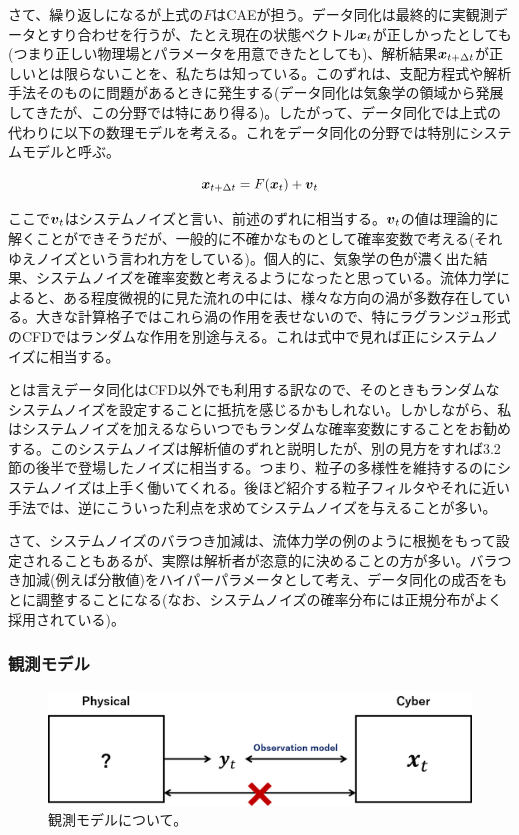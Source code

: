 \documentclass[dvipdfmx, 9pt, a4paper]{jsarticle}
\newcommand{\bm}[1]{{\mbox{\boldmath $#1$}}}
\begin{document}
さて、繰り返しになるが上式の$F$はCAEが担う。データ同化は最終的に実観測データとすり合わせを行うが、たとえ現在の状態ベクトル$\bm x_t$が正しかったとしても(つまり正しい物理場とパラメータを用意できたとしても)、解析結果$\bm x_{t+\Delta t}$が正しいとは限らないことを、私たちは知っている。このずれは、支配方程式や解析手法そのものに問題があるときに発生する(データ同化は気象学の領域から発展してきたが、この分野では特にあり得る)。したがって、データ同化では上式の代わりに以下の数理モデルを考える。これをデータ同化の分野では特別にシステムモデルと呼ぶ。
\begin{tcolorbox}[title=データ同化のシステムモデル]
\begin{equation}
\bm x_{t+\Delta t}=F(\bm x_t)+\bm v_t
\end{equation}
\end{tcolorbox}
ここで$\bm v_t$はシステムノイズと言い、前述のずれに相当する。$\bm v_t$の値は理論的に解くことができそうだが、一般的に不確かなものとして確率変数で考える(それゆえノイズという言われ方をしている)。個人的に、気象学の色が濃く出た結果、システムノイズを確率変数と考えるようになったと思っている。流体力学によると、ある程度微視的に見た流れの中には、様々な方向の渦が多数存在している。大きな計算格子ではこれら渦の作用を表せないので、特にラグランジュ形式のCFDではランダムな作用を別途与える。これは式中で見れば正にシステムノイズに相当する。\par
とは言えデータ同化はCFD以外でも利用する訳なので、そのときもランダムなシステムノイズを設定することに抵抗を感じるかもしれない。しかしながら、私はシステムノイズを加えるならいつでもランダムな確率変数にすることをお勧めする。このシステムノイズは解析値のずれと説明したが、別の見方をすれば3.2節の後半で登場したノイズに相当する。つまり、粒子の多様性を維持するのにシステムノイズは上手く働いてくれる。後ほど紹介する粒子フィルタやそれに近い手法では、逆にこういった利点を求めてシステムノイズを与えることが多い。\par
さて、システムノイズのバラつき加減は、流体力学の例のように根拠をもって設定されることもあるが、実際は解析者が恣意的に決めることの方が多い。バラつき加減(例えば分散値)をハイパーパラメータとして考え、データ同化の成否をもとに調整することになる(なお、システムノイズの確率分布には正規分布がよく採用されている)。

\subsubsection{観測モデル}

\begin{figure}[t]
\begin{center}
\includegraphics[width=12cm]{"fig10.png"}
\caption{観測モデルについて。}
\end{center}
\end{figure}
\end{document}

